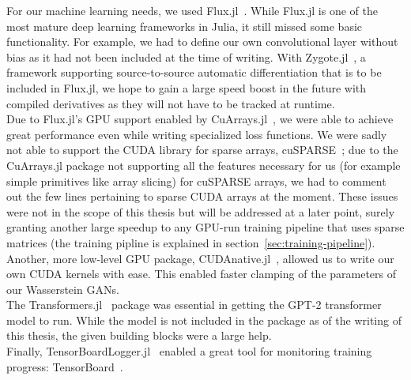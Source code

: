 For our machine learning needs, we used
\mbox{Flux.jl}~\cite{FluxMLFluxJl2019}. While \mbox{Flux.jl} is one of
the most mature deep learning frameworks in Julia, it still missed
some basic functionality. For example, we had to define our own
convolutional layer without bias as it had not been included at the
time of writing. With \mbox{Zygote.jl}~\cite{FluxMLZygoteJl2019}, a
framework supporting source-to-source automatic differentiation that
is to be included in \mbox{Flux.jl}, we hope to gain a large speed
boost in the future with compiled derivatives as they will not have to
be tracked at runtime.
\\
Due to \mbox{Flux.jl}'s GPU support enabled by
\mbox{CuArrays.jl}~\cite{JuliaGPUCuArraysJl2019}, we were able to
achieve great performance even while writing specialized loss
functions. We were sadly not able to support the CUDA library for
sparse arrays, cuSPARSE~\cite{CuSPARSE}; due to the \mbox{CuArrays.jl}
package not supporting all the features necessary for us (for example
simple primitives like array slicing) for cuSPARSE arrays, we had to
comment out the few lines pertaining to sparse CUDA arrays at the
moment. These issues were not in the scope of this thesis but will be
addressed at a later point, surely granting another large speedup to
any GPU-run training pipeline that uses sparse matrices (the training
pipline is explained in section~\ref{sec:training-pipeline}). Another,
more low-level GPU package,
\mbox{CUDAnative.jl}~\cite{JuliaGPUCUDAnativeJl2019}, allowed us to
write our own CUDA kernels with ease. This enabled faster clamping of
the parameters of our Wasserstein GANs. \\
The \mbox{Transformers.jl}~\cite{peterChengchingwenTransformersJl2019}
package was essential in getting the GPT-2 transformer model to run.
While the model is not included in the package as of the writing of
this thesis, the given building blocks were a large help. \\
Finally,
\mbox{TensorBoardLogger.jl}~\cite{vicentiniPhilipVincTensorBoardLoggerJl2019}
enabled a great tool for monitoring training progress:
TensorBoard~\cite{TensorBoard}.


